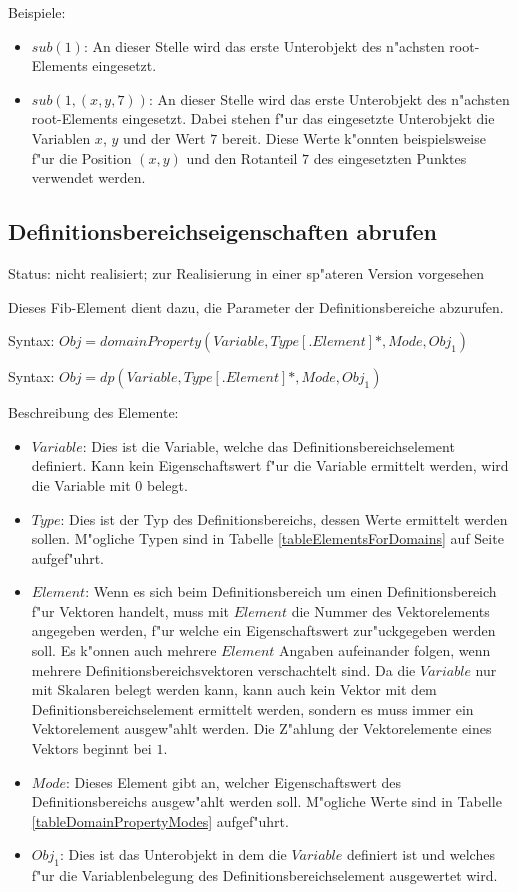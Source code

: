 \bigskip\noindent
Beispiele:
\begin{itemize}
 \item $sub( 1 )$: An dieser Stelle wird das erste Unterobjekt des n"achsten root-Ele\-ments eingesetzt.
 \item $sub( 1, ( x, y, 7 ) )$: An dieser Stelle wird das erste Unterobjekt des n"achsten root-Elements eingesetzt. Dabei stehen f"ur das eingesetzte Unterobjekt die Variablen $x$, $y$ und der Wert $7$ bereit. Diese Werte k"onnten beispielsweise f"ur die Position $(x, y)$ und den Rotanteil $7$ des eingesetzten Punktes verwendet werden.
\end{itemize}



\subsection{Definitionsbereichseigenschaften abrufen}
\label{fibDomeinProperties}

Status: nicht realisiert; zur Realisierung in einer sp"ateren Version vorgesehen

\bigskip\noindent
Dieses Fib-Element dient dazu, die Parameter der Definitionsbereiche abzurufen.

\bigskip\noindent
Syntax:
$Obj = domainProperty( Variable , Type[.Element]*, Mode, Obj_1 )$

\bigskip\noindent
Syntax:
$Obj = dp( Variable , Type[.Element]*, Mode, Obj_1 )$

\bigskip\noindent
Beschreibung des Elemente:
\begin{itemize}
 \item $Variable$: Dies ist die Variable, welche das Definitionsbereichselement definiert. Kann kein Eigenschaftswert f"ur die Variable ermittelt werden, wird die Variable mit $0$ belegt.
 \item $Type$: Dies ist der Typ des Definitionsbereichs, dessen Werte ermittelt werden sollen. M"ogliche Typen sind in Tabelle \ref{tableElementsForDomains} auf Seite \pageref{tableElementsForDomains} aufgef"uhrt.
 \item $Element$: Wenn es sich beim Definitionsbereich um einen Definitionsbereich f"ur Vektoren handelt, muss mit $Element$ die Nummer des Vektorelements angegeben werden, f"ur welche ein Eigenschaftswert zur"uckgegeben werden soll. Es k"onnen auch mehrere $Element$ Angaben aufeinander folgen, wenn mehrere Definitionsbereichsvektoren verschachtelt sind. Da die $Variable$ nur mit Skalaren belegt werden kann, kann auch kein Vektor mit dem Definitionsbereichselement ermittelt werden, sondern es muss immer ein Vektorelement ausgew"ahlt werden. Die Z"ahlung der Vektorelemente eines Vektors beginnt bei $1$. 
 \item $Mode$: Dieses Element gibt an, welcher Eigenschaftswert des Definitionsbereichs ausgew"ahlt werden soll. M"ogliche Werte sind in Tabelle \ref{tableDomainPropertyModes} aufgef"uhrt.
 \item $Obj_1$: Dies ist das Unterobjekt in dem die $Variable$ definiert ist und welches f"ur die Variablenbelegung des Definitionsbereichselement ausgewertet wird.
\end{itemize}

